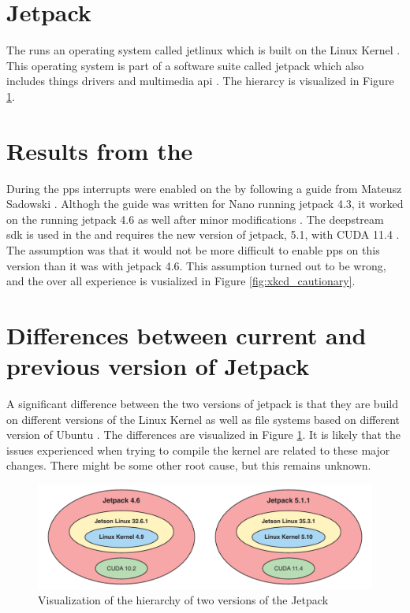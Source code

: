 \section{Jetpack}
The \jx runs an operating system called \gls{jetlinux} which is built on the Linux Kernel \cite{JetsonLinux352023}.
This operating system is part of a software suite called \gls{jetpack} which also includes things \cuda drivers and multimedia \gls{api} \cite{nvidiaJetPackSDK2023}.
The hierarcy is visualized in Figure \ref{fig:jetpack_hierarchy}.

\section{Results from the \preproject}
During the \preproject \gls{pps} interrupts were enabled on the \jx by following a guide from Mateusz Sadowski \cite{sadowskiEnablingPPSJetson2020} \cite[26]{martensPortableSensorRig2022}.
Althogh the guide was written for \jetson Nano running \gls{jetpack} 4.3, it worked on the \jx running \gls{jetpack} 4.6 as well after minor modifications \cite{sadowskiEnablingPPSJetson2020} \cite[26]{martensPortableSensorRig2022}.
The \gls{deepstream} \gls{sdk} is used in the \master and requires the new version of \gls{jetpack}, 5.1, with CUDA 11.4 \cite{nvidiaDeepStreamSDKGet2019}.
The assumption was that it would not be more difficult to enable \gls{pps} on this version than it was with \gls{jetpack} 4.6.
This assumption turned out to be wrong, and the over all experience is vusialized in Figure \ref{fig:xkcd_cautionary}.

\section{Differences between current and previous version of Jetpack}
A significant difference between the two versions of \gls{jetpack} is that they are build on different versions of the Linux Kernel as well as file systems based on different version of Ubuntu \cite{nvidiaJetPackSDK2022} \cite{nvidiaJetPackSDK2023}.
The differences are visualized in Figure \ref{fig:jetpack_hierarchy}.
It is likely that the issues experienced when trying to compile the kernel are related to these major changes.
There might be some other root cause, but this remains unknown.

\begin{figure}[H]
    \centering
    \includegraphics[width=\textwidth]{figures/jetpack_hierarchy/hierarchy.pdf}
    \caption{Visualization of the hierarchy of two versions of the Jetpack\cite{nvidiaJetPackSDK2022}\cite{nvidiaJetPackSDK2023}}
    \label{fig:jetpack_hierarchy}
\end{figure}

